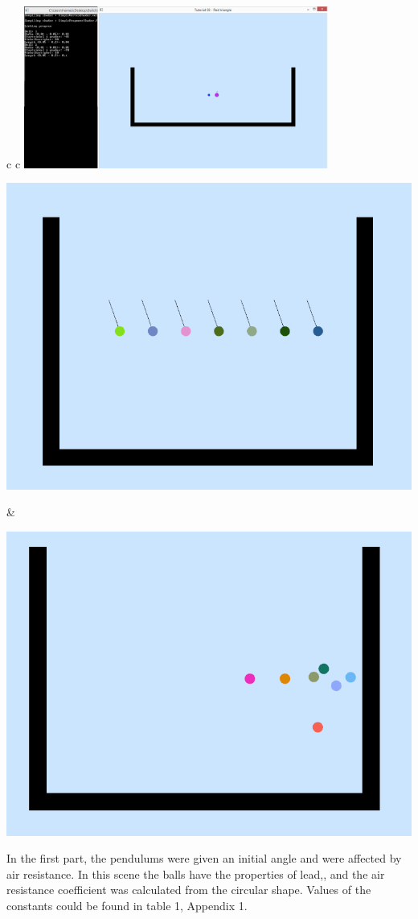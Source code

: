 \documentclass[a4paper,12pt,twoside,english]{article}
\begin{document}
\begin{table}[h!]
  \centering
   \begin{tabular}{c c}
      {\includegraphics[width=100mm]{bilder/ConsoleAndProgram.png} } \\
     \begin{minipage}{0.5\textwidth}
      \includegraphics[width=\linewidth, width=60mm]{bilder/OpenGL_pendulum1.png}
      \centering
    \end{minipage} 
    & 
    \begin{minipage}{0.5\textwidth}
      \includegraphics[width=\linewidth, width=60mm]{bilder/OpenGL_bounce1.png}
      \centering
    \end{minipage} 
  \end{tabular}
\end{table}
In the first part, the pendulums were given an initial angle and were affected by air resistance. In this scene the balls have the properties of lead,, and the air resistance coefficient was calculated from the circular shape.  Values of the constants could be found in table 1, Appendix 1.
\end{document}
